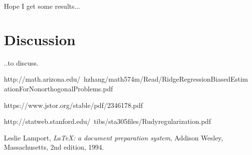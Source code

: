 \documentclass[a4paper,12pt, english]{article}
\begin{document}
Hope I get some results...

\section*{Discussion}

..to discuss. 

http://math.arizona.edu/~hzhang/math574m/Read/RidgeRegressionBiasedEstimationForNonorthogonalProblems.pdf

https://www.jstor.org/stable/pdf/2346178.pdf

http://statweb.stanford.edu/~tibs/sta305files/Rudyregularization.pdf

\begin{thebibliography}{9}

  Leslie Lamport,
  \textit{\LaTeX: a document preparation system},
  Addison Wesley, Massachusetts,
  2nd edition,
  1994.
  


\end{thebibliography}
\end{document}
